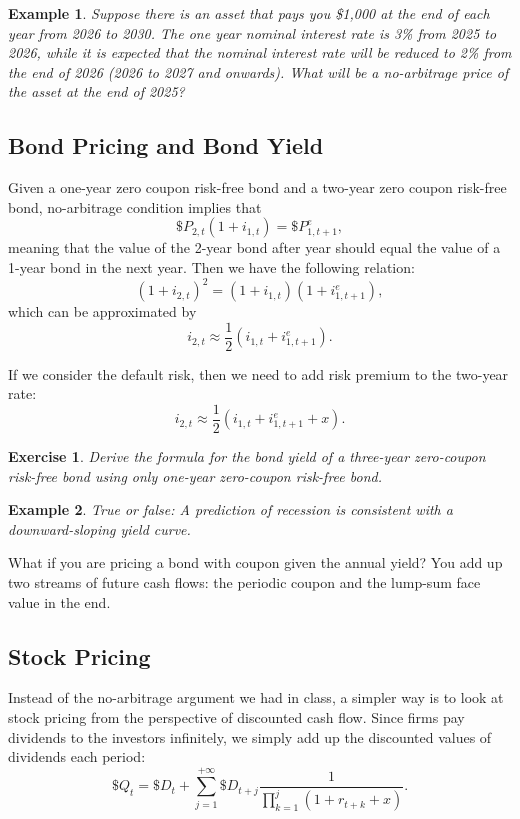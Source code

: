 \documentclass[12pt]{article}
\newtheorem{example}{Example}
\newtheorem{exercise}{Exercise}
\begin{document}
\begin{example}
    Suppose there is an asset that pays you \$1,000 at the end of each year from 2026 to 2030. The one year nominal interest rate is 3\% from 2025 to 2026, while it is expected that the nominal interest rate will be reduced to 2\% from the end of 2026 (2026 to 2027 and onwards). What will be a no-arbitrage price of the asset at the end of 2025?
\end{example}

\subsection*{Bond Pricing and Bond Yield}
Given a one-year zero coupon risk-free bond and a two-year zero coupon risk-free bond, no-arbitrage condition implies that
\[\$P_{2,t} (1 + i_{1,t}) = \$P_{1, t+1}^e,\]
meaning that the value of the 2-year bond after year should equal the value of a 1-year bond in the next year. Then we have the following relation:
\[(1 + i_{2,t})^2 = (1 + i_{1,t})(1 + i_{1, t+1}^e),\]
which can be approximated by
\[ i_{2,t} \approx \frac{1}{2}(i_{1,t} + i_{1, t+1}^e).\]

If we consider the default risk, then we need to add risk premium to the two-year rate:
\[ i_{2,t} \approx \frac{1}{2}(i_{1,t} + i_{1, t+1}^e + x).\]

\begin{exercise}
    Derive the formula for the bond yield of a three-year zero-coupon risk-free bond using only one-year zero-coupon risk-free bond.
\end{exercise}

\begin{example}
    True or false: A prediction of recession is consistent with a downward-sloping yield curve.
\end{example}

What if you are pricing a bond with coupon given the annual yield? You add up two streams of future cash flows: the periodic coupon and the lump-sum face value in the end.

\subsection*{Stock Pricing}
Instead of the no-arbitrage argument we had in class, a simpler way is to look at stock pricing from the perspective of discounted cash flow. Since firms pay dividends to the investors infinitely, we simply add up the discounted values of dividends each period:
\[ \$Q_t = \$D_t + \sum_{j=1}^{+\infty} \$D_{t+j} \frac{1}{\prod_{k=1}^j(1+r_{t+k} + x)}. \]
\end{document}
